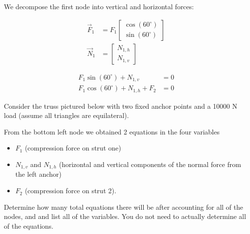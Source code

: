 \begin{applicationActivities}
\begin{observation}
\drawtruss[0.8]
We decompose the first node into vertical and horizontal forces:
\begin{multicols}{2}
\begin{center}
\end{center}
%
\begin{align*}
\vec{F}_1 &= F_1\begin{bmatrix} \cos(60^\circ) \\ \sin(60^\circ) \end{bmatrix} \\
\vec{N}_1 &= \begin{bmatrix} N_{1,h} \\ N_{1,v} \end{bmatrix}
\end{align*}
\end{multicols}

\begin{align*}
F_1 \sin(60^\circ)+N_{1,v} &= 0 \\
F_1 \cos(60^\circ)+N_{1,h}+F_2 &= 0
\end{align*}
\end{observation}

\begin{activity}{10}
Consider the truss pictured below with two fixed anchor points and a 10000 N load (assume all triangles are equilateral).
\drawtruss

From the bottom left node we obtained 2 equations in the four variables
\begin{itemize}
\item $F_{1}$ (compression force on strut one)
\item $N_{1,v}$ and $N_{1,h}$ (horizontal and vertical components of the normal force from the left anchor)
\item $F_2$ (compression force on strut 2).
\end{itemize}

\begin{subactivity}
Determine how many total equations there will be after accounting for all of the nodes, and and list all of the variables.  You do not need to actually determine all of the equations.
\end{subactivity}
\end{activity}



\end{applicationActivities}
